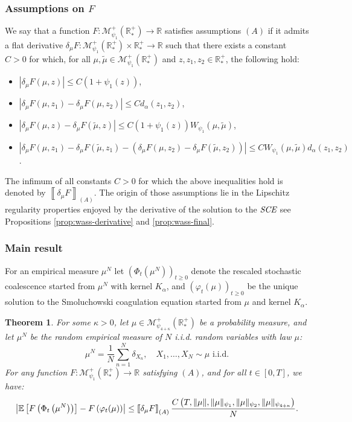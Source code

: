 \documentclass[11pt,a4paper]{article}
\newcommand{\RR}{\mathbb{R}}
\newcommand{\RRP}{\mathbb{R}^+_*}
\newcommand{\MC}{\mathcal{M}}
\newcommand{\SCE}{\emph{SCE}}
\newcommand{\A}{(A)}
\newcommand{\Proc}[1]{\left(#1\right)_{t\geq 0}}
\newtheorem{theorem}{Theorem}[section]
\begin{document}
\subsubsection*{Assumptions on $F$}

We say that a function \(F : \MC^+_{\psi_1}(\RRP) \to \RR\) satisfies assumptions \(\A\) if it admits a flat derivative \(\delta_\mu F : \MC^+_{\psi_1}(\RRP) \times \RRP \to \RR\) such that there exists a constant \(C > 0\) for which, for all \(\mu, \tilde{\mu} \in \MC^+_{\psi_1}(\RRP)\) and \(z, z_1, z_2 \in \RRP\), the following hold:
\begin{itemize}
    \item \(|\delta_\mu F(\mu, z)| \leq C(1 + \psi_1(z))\),
    \item \(|\delta_\mu F(\mu, z_1) - \delta_\mu F(\mu, z_2)| \leq C d_\alpha(z_1, z_2)\),
    \item \(|\delta_\mu F(\mu, z) - \delta_\mu F(\tilde{\mu}, z)| \leq C(1 + \psi_1(z)) W_{\psi_1}(\mu, \tilde{\mu})\),
    \item \(|\delta_\mu F(\mu, z_1) - \delta_\mu F(\tilde{\mu}, z_1) - (\delta_\mu F(\mu, z_2) - \delta_\mu F(\tilde{\mu}, z_2))| \leq C W_{\psi_1}(\mu, \tilde{\mu}) d_\alpha(z_1, z_2)\).
\end{itemize}

The infimum of all constants \(C > 0\) for which the above inequalities hold is denoted by \(\left\llbracket \delta_\mu F \right\rrbracket_{\A}\). The origin of those assumptions lie in the Lipschitz regularity properties enjoyed by the derivative of the solution to the $\SCE$ see Propositions \ref{prop:wass-derivative} and \ref{prop:wass-final}.

\subsubsection*{Main result}


For an empirical measure $\mu^N$ let \(\Proc{\Phi_t(\mu^N)}\) denote the rescaled stochastic coalescence started from \(\mu^N\) with kernel \(K_\alpha\), and \(\Proc{\varphi_t(\mu)}\) be the unique solution to the Smoluchowski coagulation equation started from \(\mu\) and kernel \(K_\alpha\).
\begin{theorem}\label{thm:main-result}
    For some $\kappa > 0$, let \(\mu \in \MC^+_{\psi_{4 + \kappa}}(\RRP)\) be a probability measure, and let \(\mu^N\) be the random empirical measure of \(N\) i.i.d. random variables with law \(\mu\):
    \[
        \mu^N = \frac{1}{N} \sum_{n = 1}^N \delta_{X_n}, \quad X_1, \dots, X_N \sim \mu \text{ i.i.d.}
    \]
    For any function \(F : \MC^+_{\psi_1}(\RRP) \to \RR\) satisfying \(\A\), and for all \(t \in [0, T]\), we have:
    \[
    \left| \vphantom{A^2}\mathbb{E}\left[F\left(\Phi_t\left(\mu^N\right)\right)\right] - F\left(\varphi_t(\mu)\right) \right| \leq \left\llbracket \delta_\mu F \right\rrbracket_{\A}  \frac{C\left(T, \|\mu\|, \|\mu\|_{\psi_1}, \|\mu\|_{\psi_2},\|\mu\|_{\psi_{4 + \kappa}}\right)}{N}.
    \]
\end{theorem}
\end{document}
